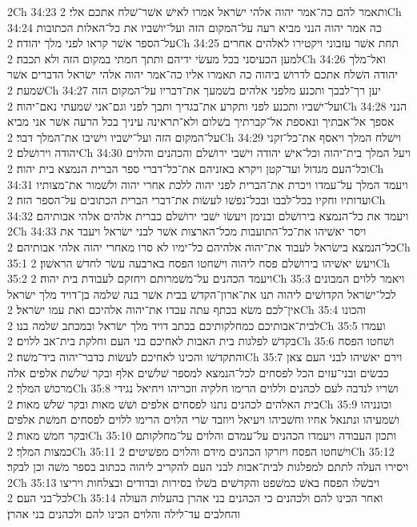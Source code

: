 2Ch 34:23  ותאמר להם כה־אמר יהוה אלהי ישׂראל אמרו לאישׁ אשׁר־שׁלח אתכם אלי׃
2Ch 34:24  כה אמר יהוה הנני מביא רעה על־המקום הזה ועל־יושׁביו את כל־האלות הכתובות על־הספר אשׁר קראו לפני מלך יהודה׃
2Ch 34:25  תחת אשׁר עזבוני ויקטירו לאלהים אחרים למען הכעיסני בכל מעשׂי ידיהם ותתך חמתי במקום הזה ולא תכבה׃
2Ch 34:26  ואל־מלך יהודה השׁלח אתכם לדרושׁ ביהוה כה תאמרו אליו כה־אמר יהוה אלהי ישׂראל הדברים אשׁר שׁמעת׃
2Ch 34:27  יען רך־לבבך ותכנע מלפני אלהים בשׁמעך את־דבריו על־המקום הזה ועל־ישׁביו ותכנע לפני ותקרע את־בגדיך ותבך לפני וגם־אני שׁמעתי נאם־יהוה׃
2Ch 34:28  הנני אספך אל־אבתיך ונאספת אל־קברתיך בשׁלום ולא־תראינה עיניך בכל הרעה אשׁר אני מביא על־המקום הזה ועל־ישׁביו וישׁיבו את־המלך דבר׃
2Ch 34:29  וישׁלח המלך ויאסף את־כל־זקני יהודה וירושׁלם׃
2Ch 34:30  ויעל המלך בית־יהוה וכל־אישׁ יהודה וישׁבי ירושׁלם והכהנים והלוים וכל־העם מגדול ועד־קטן ויקרא באזניהם את־כל־דברי ספר הברית הנמצא בית יהוה׃
2Ch 34:31  ויעמד המלך על־עמדו ויכרת את־הברית לפני יהוה ללכת אחרי יהוה ולשׁמור את־מצותיו ועדותיו וחקיו בכל־לבבו ובכל־נפשׁו לעשׂות את־דברי הברית הכתובים על־הספר הזה׃
2Ch 34:32  ויעמד את כל־הנמצא בירושׁלם ובנימן ויעשׂו ישׁבי ירושׁלם כברית אלהים אלהי אבותיהם׃
2Ch 34:33  ויסר יאשׁיהו את־כל־התועבות מכל־הארצות אשׁר לבני ישׂראל ויעבד את כל־הנמצא בישׂראל לעבוד את־יהוה אלהיהם כל־ימיו לא סרו מאחרי יהוה אלהי אבותיהם׃
2Ch 35:1  ויעשׂ יאשׁיהו בירושׁלם פסח ליהוה וישׁחטו הפסח בארבעה עשׂר לחדשׁ הראשׁון׃
2Ch 35:2  ויעמד הכהנים על־משׁמרותם ויחזקם לעבודת בית יהוה׃
2Ch 35:3  ויאמר ללוים המבונים לכל־ישׂראל הקדושׁים ליהוה תנו את־ארון־הקדשׁ בבית אשׁר בנה שׁלמה בן־דויד מלך ישׂראל אין־לכם משׂא בכתף עתה עבדו את־יהוה אלהיכם ואת עמו ישׂראל׃
2Ch 35:4  והכונו לבית־אבותיכם כמחלקותיכם בכתב דויד מלך ישׂראל ובמכתב שׁלמה בנו׃
2Ch 35:5  ועמדו בקדשׁ לפלגות בית האבות לאחיכם בני העם וחלקת בית־אב ללוים׃
2Ch 35:6  ושׁחטו הפסח והתקדשׁו והכינו לאחיכם לעשׂות כדבר־יהוה ביד־משׁה׃
2Ch 35:7  וירם יאשׁיהו לבני העם צאן כבשׂים ובני־עזים הכל לפסחים לכל־הנמצא למספר שׁלשׁים אלף ובקר שׁלשׁת אלפים אלה מרכושׁ המלך׃
2Ch 35:8  ושׂריו לנדבה לעם לכהנים וללוים הרימו חלקיה וזכריהו ויחיאל נגידי בית האלהים לכהנים נתנו לפסחים אלפים ושׁשׁ מאות ובקר שׁלשׁ מאות׃
2Ch 35:9  וכונניהו ושׁמעיהו ונתנאל אחיו וחשׁביהו ויעיאל ויוזבד שׂרי הלוים הרימו ללוים לפסחים חמשׁת אלפים ובקר חמשׁ מאות׃
2Ch 35:10  ותכון העבודה ויעמדו הכהנים על־עמדם והלוים על־מחלקותם כמצות המלך׃
2Ch 35:11  וישׁחטו הפסח ויזרקו הכהנים מידם והלוים מפשׁיטים׃
2Ch 35:12  ויסירו העלה לתתם למפלגות לבית־אבות לבני העם להקריב ליהוה ככתוב בספר משׁה וכן לבקר׃
2Ch 35:13  ויבשׁלו הפסח באשׁ כמשׁפט והקדשׁים בשׁלו בסירות ובדודים ובצלחות ויריצו לכל־בני העם׃
2Ch 35:14  ואחר הכינו להם ולכהנים כי הכהנים בני אהרן בהעלות העולה והחלבים עד־לילה והלוים הכינו להם ולכהנים בני אהרן׃

